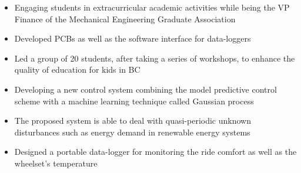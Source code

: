 \documentclass[10pt,letterpaper,ragged2e,compact]{mocv}
\begin{document}
\begin{paracol}{2}
\begin{itemize}
        \item Engaging students in extracurricular academic activities while being the VP Finance of the Mechanical Engineering Graduate Association 
    \end{itemize}
    \divider
    \begin{itemize}
        \item Developed PCBs as well as the software interface for data-loggers
    \end{itemize}
    \divider
    \begin{itemize}
        \item Led a group of 20 students, after taking a series of workshops, to enhance the quality of education for kids in BC
    \end{itemize}
    \begin{itemize}
        \item Developing a new control system combining the model predictive control scheme with a machine learning technique called Gaussian process
        \item The proposed system is able to deal with quasi-periodic unknown disturbances such as energy demand in renewable energy systems
    \end{itemize}
    \divider
    \begin{itemize}
        \item Designed a portable data-logger for monitoring the ride comfort as well as the wheelset’s temperature
    \end{itemize}
    \divider

\end{paracol}
\end{document}
